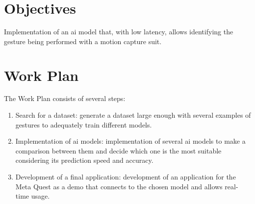 \section{Objectives}
Implementation of an \gls{ai} model that, with low latency, allows identifying the gesture being performed with a motion capture suit.

\section{Work Plan}
The Work Plan consists of several steps:

\begin{enumerate}
	\item Search for a dataset: generate a dataset large enough with several examples of gestures to adequately train different models.
	\item Implementation of \gls{ai} models: implementation of several \gls{ai} models to make a comparison between them and decide which one is the most suitable considering its prediction speed and accuracy.
	\item Development of a final application: development of an application for the Meta Quest as a demo that connects to the chosen model and allows real-time usage.
\end{enumerate}









